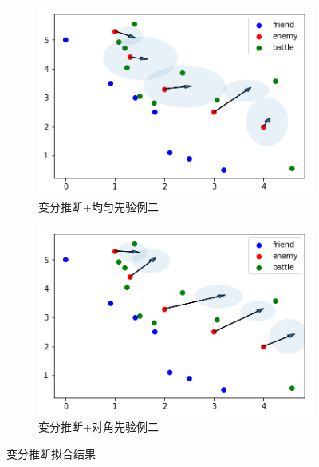 \documentclass{article}
\begin{document}
\begin{figure}[ht]
\begin{subfigure}[b]{0.45\linewidth}
    \includegraphics[width=\linewidth]{VI21.png}
    \caption{变分推断+均匀先验例二}
  \end{subfigure}
  \begin{subfigure}[b]{0.45\linewidth}
    \includegraphics[width=\linewidth]{VI22.png}
    \caption{变分推断+对角先验例二}
  \end{subfigure}
  \caption{变分推断拟合结果}
  \label{fig:VI}
\end{figure}
\end{document}

